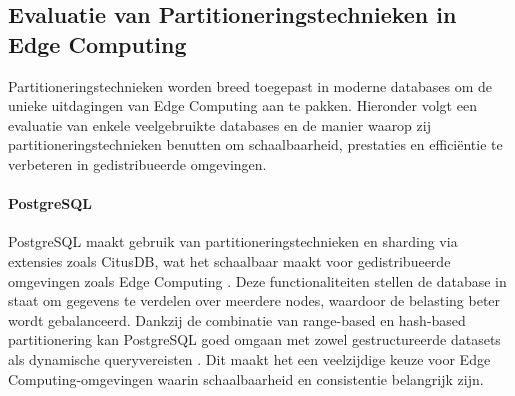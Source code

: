 \begin{table}[h]
    \centering
    \caption{Overzicht van de specificaties van MongoDB. \cite{MongoDBDocumentation}}
\end{table}

\subsection{Evaluatie van Partitioneringstechnieken in Edge Computing}

Partitioneringstechnieken worden breed toegepast in moderne databases om de unieke uitdagingen van Edge Computing aan te pakken. Hieronder volgt een evaluatie van enkele veelgebruikte databases en de manier waarop zij partitioneringstechnieken benutten om schaalbaarheid, prestaties en efficiëntie te verbeteren in gedistribueerde omgevingen.

\paragraph{PostgreSQL}  
PostgreSQL maakt gebruik van partitioneringstechnieken en sharding via extensies zoals CitusDB, wat het schaalbaar maakt voor gedistribueerde omgevingen zoals Edge Computing \autocite{PostgreSQLDocumentation}. Deze functionaliteiten stellen de database in staat om gegevens te verdelen over meerdere nodes, waardoor de belasting beter wordt gebalanceerd. Dankzij de combinatie van range-based en hash-based partitionering kan PostgreSQL goed omgaan met zowel gestructureerde datasets als dynamische queryvereisten \autocite{Kleppmann2017}. Dit maakt het een veelzijdige keuze voor Edge Computing-omgevingen waarin schaalbaarheid en consistentie belangrijk zijn.

